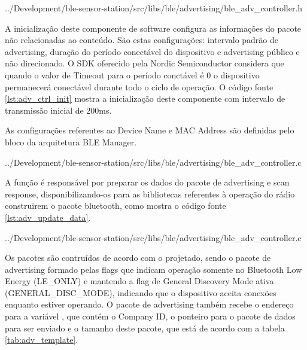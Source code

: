 \begin{minipage}{0.95\linewidth} 
 
{../Development/ble-sensor-station/src/libs/ble/advertising/ble_adv_controller.h}
\end{minipage}

A inicialização deste componente de software configura as informações do pacote
não relacionadas ao conteúdo. São estas configurações: intervalo padrão de
advertising, duração do período conectável do dispositivo e advertising público
e não direcionado. O SDK oferecido pela Nordic Semiconductor considera que
quando o valor de Timeout para o período conctável é 0 o dispositivo permanecerá
conectável durante todo o ciclo de operação\cite{nrf51sdkManual}. O código fonte
\ref{lst:adv_ctrl_init} mostra a inicialização deste componente com intervalo de
transmissão inicial de 200ms.

As configurações referentes ao Device Name e MAC Address são definidas pelo
bloco da arquitetura BLE Manager.

\begin{minipage}{0.95\linewidth} 

{../Development/ble-sensor-station/src/libs/ble/advertising/ble_adv_controller.c}
\end{minipage}

A função  é responsável por preparar os dados do
pacote de advertising e scan response, disponibilizando-os para as bibliotecas
referentes à operação do rádio construirem o pacote bluetooth, como mostra o código fonte
\ref{lst:adv_update_data}.

\begin{minipage}{0.95\linewidth} 
 
{../Development/ble-sensor-station/src/libs/ble/advertising/ble_adv_controller.c}
\end{minipage}

Os pacotes são contruídos de acordo com o projetado, sendo o pacote de
advertising formado pelas flags que indicam operação somente no Bluetooth Low
Energy (LE\_ONLY) e mantendo a flag de General Discovery Mode ativa
(GENERAL\_DISC\_MODE), indicando que o dispositivo aceita conexões enquanto
estiver operando. O pacote de advertising também recebe o endereço para a
variável , que contém o Company ID, o ponteiro para o
pacote de dados para ser enviado e o tamanho deste pacote, que está de acordo
com a tabela \ref{tab:adv_template}.

